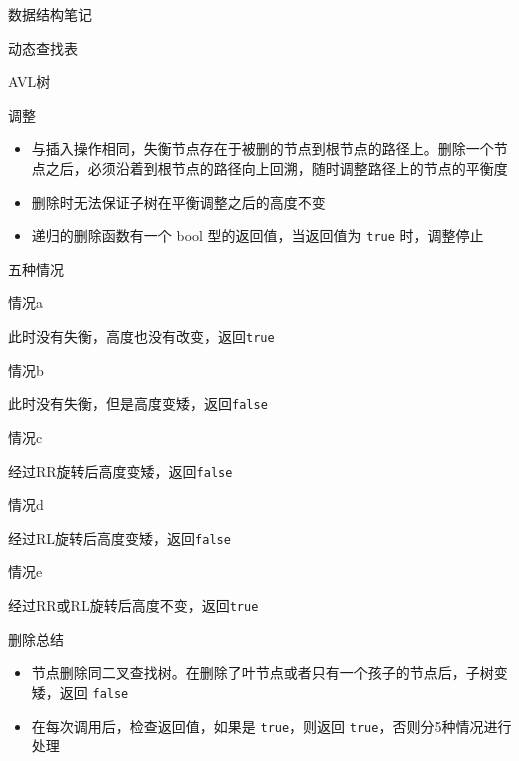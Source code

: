 \documentclass[
  ignorenonframetext,
]{beamer}
\providecommand{\tightlist}{%
  \setlength{\itemsep}{0pt}\setlength{\parskip}{0pt}}
\begin{document}
\begin{frame}[fragile]{数据结构笔记}
\begin{block}{动态查找表}
\begin{block}{AVL树}
\begin{block}{调整}
\protect{}\label{ux8c03ux6574}
\begin{itemize}
\tightlist
\item
  与插入操作相同，失衡节点存在于被删的节点到根节点的路径上。删除一个节点之后，必须沿着到根节点的路径向上回溯，随时调整路径上的节点的平衡度
\item
  删除时无法保证子树在平衡调整之后的高度不变
\item
  递归的删除函数有一个 bool 型的返回值，当返回值为 \texttt{true}
  时，调整停止
\end{itemize}
\end{block}

\begin{block}{五种情况}
\protect{}\label{ux4e94ux79cdux60c5ux51b5}
\begin{block}{情况a}
\protect{}\label{ux60c5ux51b5a}

此时没有失衡，高度也没有改变，返回\texttt{true}
\end{block}

\begin{block}{情况b}
\protect{}\label{ux60c5ux51b5b}

此时没有失衡，但是高度变矮，返回\texttt{false}
\end{block}

\begin{block}{情况c}
\protect{}\label{ux60c5ux51b5c}

经过RR旋转后高度变矮，返回\texttt{false}
\end{block}

\begin{block}{情况d}
\protect{}\label{ux60c5ux51b5d}

经过RL旋转后高度变矮，返回\texttt{false}
\end{block}

\begin{block}{情况e}
\protect{}\label{ux60c5ux51b5e}

经过RR或RL旋转后高度不变，返回\texttt{true}
\end{block}
\end{block}

\begin{block}{删除总结}
\protect{}\label{ux5220ux9664ux603bux7ed3}
\begin{itemize}
\tightlist
\item
  节点删除同二叉查找树。在删除了叶节点或者只有一个孩子的节点后，子树变矮，返回
  \texttt{false}
\item
  在每次调用后，检查返回值，如果是 \texttt{true}，则返回
  \texttt{true}，否则分5种情况进行处理
\end{itemize}
\end{block}


\end{block}
\end{block}
\end{frame}
\end{document}
